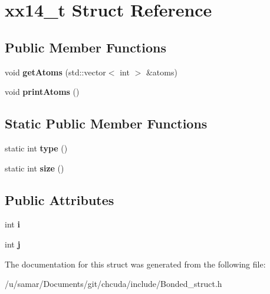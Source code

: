 \hypertarget{structxx14__t}{}\section{xx14\+\_\+t Struct Reference}
\label{structxx14__t}
\subsection*{Public Member Functions}
\begin{DoxyCompactItemize}
\item 
\hypertarget{structxx14__t_aa0f2712a93d40d3ba7650f467d347c73}{}\label{structxx14__t_aa0f2712a93d40d3ba7650f467d347c73} 
void {\bfseries get\+Atoms} (std\+::vector$<$ int $>$ \&atoms)
\item 
\hypertarget{structxx14__t_a8d7ce42814d40fc5c2a9b2a1354a5867}{}\label{structxx14__t_a8d7ce42814d40fc5c2a9b2a1354a5867} 
void {\bfseries print\+Atoms} ()
\end{DoxyCompactItemize}
\subsection*{Static Public Member Functions}
\begin{DoxyCompactItemize}
\item 
\hypertarget{structxx14__t_a600980c6345b965f54dd27d2c9d6f49a}{}\label{structxx14__t_a600980c6345b965f54dd27d2c9d6f49a} 
static int {\bfseries type} ()
\item 
\hypertarget{structxx14__t_a7def9a6d5020153481b5b6d4863b9ab3}{}\label{structxx14__t_a7def9a6d5020153481b5b6d4863b9ab3} 
static int {\bfseries size} ()
\end{DoxyCompactItemize}
\subsection*{Public Attributes}
\begin{DoxyCompactItemize}
\item 
\hypertarget{structxx14__t_a3298a5a06f650b12a880fc0e13925273}{}\label{structxx14__t_a3298a5a06f650b12a880fc0e13925273} 
int {\bfseries i}
\item 
\hypertarget{structxx14__t_a63ef3505f70348c020b494698223813e}{}\label{structxx14__t_a63ef3505f70348c020b494698223813e} 
int {\bfseries j}
\end{DoxyCompactItemize}


The documentation for this struct was generated from the following file\+:\begin{DoxyCompactItemize}
\item 
/u/samar/\+Documents/git/chcuda/include/Bonded\+\_\+struct.\+h\end{DoxyCompactItemize}
